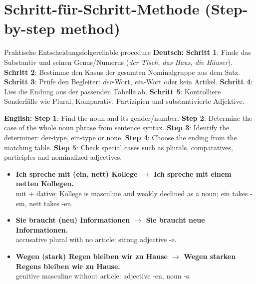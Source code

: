 \documentclass[a4paper,11pt]{article}
\newcommand{\GermanText}[1]{\textbf{Deutsch: }#1\par}
\newcommand{\EnglishText}[1]{{\small\color{SoftGray}\textbf{English: }#1\par}}
\newcommand{\ExampleItem}[2]{\item \textbf{#1}\\{\small\color{SoftGray}#2}}
\begin{document}
\section{Schritt-für-Schritt-Methode \textnormal{(Step-by-step method)}}
\begin{grammarentry}{Praktische Entscheidungsfolge}{reliable procedure}
\GermanText{\textbf{Schritt 1}: Finde das Substantiv und seinen Genus/Numerus (\emph{der Tisch, das Haus, die Häuser}). \textbf{Schritt 2}: Bestimme den Kasus der gesamten Nominalgruppe aus dem Satz. \textbf{Schritt 3}: Prüfe den Begleiter: \emph{der}-Wort, \emph{ein}-Wort oder kein Artikel. \textbf{Schritt 4}: Lies die Endung aus der passenden Tabelle ab. \textbf{Schritt 5}: Kontrolliere Sonderfälle wie Plural, Komparativ, Partizipien und substantivierte Adjektive.}
\EnglishText{\textbf{Step 1}: Find the noun and its gender/number. \textbf{Step 2}: Determine the case of the whole noun phrase from sentence syntax. \textbf{Step 3}: Identify the determiner: der-type, ein-type or none. \textbf{Step 4}: Choose the ending from the matching table. \textbf{Step 5}: Check special cases such as plurals, comparatives, participles and nominalized adjectives.}
\end{grammarentry}
\begin{exbox}\begin{itemize}
\ExampleItem{Ich spreche mit (ein, nett) Kollege $\rightarrow$ Ich spreche mit einem netten Kollegen.}{mit + dative; Kollege is masculine and weakly declined as a noun; ein takes -em, nett takes -en.}
\ExampleItem{Sie braucht (neu) Informationen $\rightarrow$ Sie braucht neue Informationen.}{accusative plural with no article: strong adjective -e.}
\ExampleItem{Wegen (stark) Regen bleiben wir zu Hause $\rightarrow$ Wegen starken Regens bleiben wir zu Hause.}{genitive masculine without article: adjective -en, noun -s.}
\end{itemize}\end{exbox}
\end{document}
